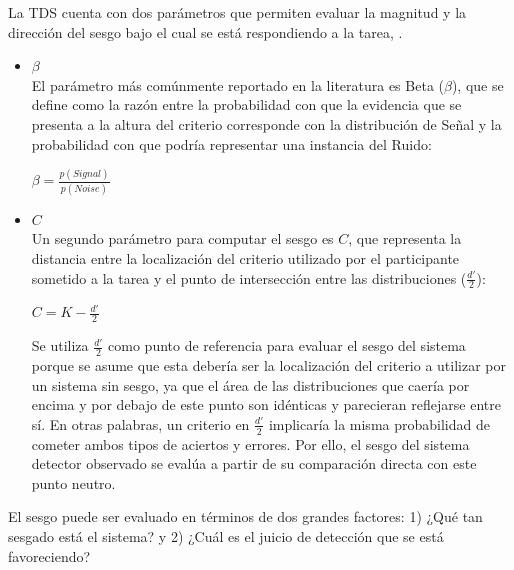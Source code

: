 \begin{itemize}
La TDS cuenta con dos parámetros que permiten evaluar la magnitud y la dirección del sesgo bajo el cual se está respondiendo a la tarea, \parencite{Macmillan1990}.\\

\begin{itemize}
\item \underline{$\beta$}\\

El parámetro más comúnmente reportado en la literatura es Beta ($\beta$), que se define como la razón entre la probabilidad con que la evidencia que se presenta a la altura del criterio corresponde con la distribución de Señal y la probabilidad con que podría representar una instancia del Ruido: \\

\begin{center}
$\beta = \frac{p(Signal)}{p(Noise)}$ \\
\end{center}

\item \underline{$C$}\\

Un segundo parámetro para computar el sesgo es $C$, que representa la distancia entre la localización del criterio utilizado por el participante sometido a la tarea y el punto de intersección entre las distribuciones ($\frac{d'}{2}$):\\

\begin{center}
$C =  K - \frac{d'}{2}$ \\
\end{center}

Se utiliza $\frac{d'}{2}$ como punto de referencia para evaluar el sesgo del sistema porque se asume que esta debería ser la localización del criterio a utilizar por un sistema sin sesgo, ya que el área de las distribuciones que caería por encima y por debajo de este punto son idénticas y parecieran reflejarse entre sí. En otras palabras, un criterio en $\frac{d'}{2}$ implicaría la misma probabilidad de cometer ambos tipos de aciertos y errores. Por ello, el sesgo del sistema detector observado se evalúa a partir de su comparación directa con este punto neutro.\\

\end{itemize}

El sesgo puede ser evaluado en términos de dos grandes factores: 1) ¿Qué tan sesgado está el sistema? y 2) ¿Cuál es el juicio de detección que se está favoreciendo?\\


\end{itemize}
